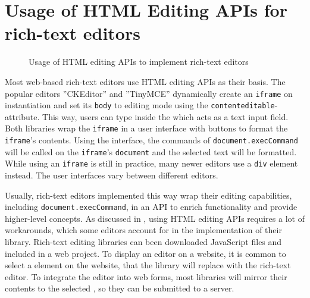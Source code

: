
\section{Usage of HTML Editing APIs for rich-text editors}
\label{sec:useage-of-html-editing-apis}

\begin{figure}[!htb]
\centering
{}
\caption{Usage of HTML editing APIs to implement rich-text editors}
\label{fig:formatting_dom_tree}
\end{figure}

Most web-based rich-text editors use HTML editing APIs as their basis. The popular editors ''CKEditor'' and ''TinyMCE'' dynamically create an \texttt{iframe} on instantiation and set its \texttt{body} to editing mode using the \texttt{contenteditable}-attribute. This way, users can type inside the  which acts as a text input field. Both libraries wrap the \texttt{iframe} in a user interface with buttons to format the \texttt{iframe}'s contents. Using the interface, the commands of \texttt{document.execCommand} will be called on the \texttt{iframe}'s \texttt{document} and the selected text will be formatted. While using an \texttt{iframe} is still in practice, many newer editors use a  \texttt{div} element instead. The user interfaces vary between different editors. %

Usually, rich-text editors implemented this way wrap their editing capabilities, including \texttt{document.execCommand}, in an API to enrich functionality and provide higher-level concepts. As discussed in , using HTML editing APIs requires a lot of workarounds, which some editors account for in the implementation of their library. Rich-text editing libraries can been downloaded JavaScript files and included in a web project. To display an editor on a website, it is common to select a  element on the website, that the library will replace with the rich-text editor. To integrate the editor into web forms, most libraries will mirror their contents to the selected , so they can be submitted to a server.

